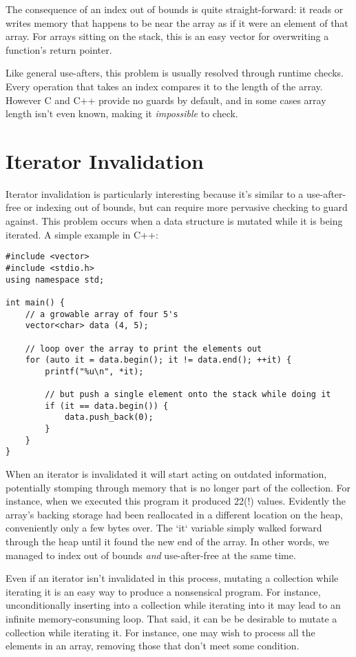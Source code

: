 The consequence of an index out of bounds is quite straight-forward: it reads
or writes memory that happens to be near the array as if it were an
element of that array. For arrays sitting on the stack, this is an easy vector
for overwriting a function's return pointer.

Like general use-afters, this problem is usually resolved through runtime
checks. Every operation that takes an index compares it to the length of the
array. However C and C++ provide no guards by default, and in some cases array
length isn't even known, making it \emph{impossible} to check.





\section{Iterator Invalidation}

Iterator invalidation is particularly interesting because it's similar to a
use-after-free or indexing out of bounds, but can require more pervasive checking
to guard against. This problem occurs when a data structure is mutated while it
is being iterated. A simple example in C++:

\begin{verbatim}
#include <vector>
#include <stdio.h>
using namespace std;

int main() {
    // a growable array of four 5's
    vector<char> data (4, 5);

    // loop over the array to print the elements out
    for (auto it = data.begin(); it != data.end(); ++it) {
        printf("%u\n", *it);

        // but push a single element onto the stack while doing it
        if (it == data.begin()) {
            data.push_back(0);
        }
    }
}
\end{verbatim}

When an iterator is invalidated it will start acting on
outdated information, potentially stomping through memory that is no longer
part of the collection. For instance, when we executed this program it produced
22(!) values. Evidently the array's backing storage had been reallocated
in a different location on the heap, conveniently only a few bytes over. The `it`
variable simply walked forward through the heap until it found the new end of
the array. In other words, we managed to index out of bounds \emph{and} use-after-free
at the same time.

Even if an iterator isn't invalidated in this process, mutating a collection
while iterating it is an easy way to produce a nonsensical program. For instance,
unconditionally inserting into a collection while iterating into it may lead
to an infinite memory-consuming loop. That said, it can be be desirable to
mutate a collection while iterating it. For instance, one may wish to process all
the elements in an array, removing those that don't meet some condition.

